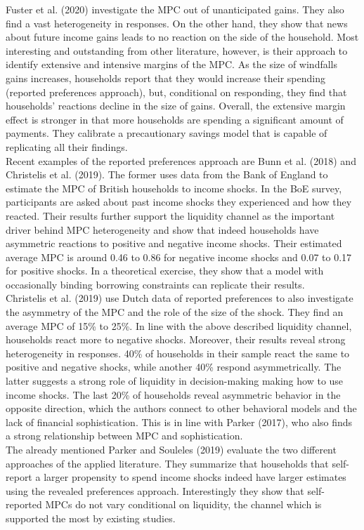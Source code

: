 Fuster et al. (2020) investigate the MPC out of unanticipated gains. They also find a vast heterogeneity in responses. On the other hand, they show that news about future income gains leads to no reaction on the side of the household. Most interesting and outstanding from other literature, however, is their approach to identify extensive and intensive margins of the MPC. As the size of windfalls gains increases, households report that they would increase their spending (reported preferences approach), but, conditional on responding, they find that households' reactions decline in the size of gains. Overall, the extensive margin effect is stronger in that more households are spending a significant amount of payments. They calibrate a precautionary savings model that is capable of replicating all their findings. \\
Recent examples of the reported preferences approach are Bunn et al. (2018) and Christelis et al. (2019). The former uses data from the Bank of England to estimate the MPC of British households to income shocks. In the BoE survey, participants are asked about past income shocks they experienced and how they reacted. Their results further support the liquidity channel as the important driver behind MPC heterogeneity and show that indeed households have asymmetric reactions to positive and negative income shocks. Their estimated average MPC is around 0.46 to 0.86 for negative income shocks and 0.07 to 0.17 for positive shocks. In a theoretical exercise, they show that a model with occasionally binding borrowing constraints can replicate their results.\\
Christelis et al. (2019) use Dutch data of reported preferences to also investigate the asymmetry of the MPC and the role of the size of the shock. They find an average MPC of 15\% to 25\%. In line with the above described liquidity channel, households react more to negative shocks. Moreover, their results reveal strong heterogeneity in responses. 40\% of households in their sample react the same to positive and negative shocks, while another 40\% respond asymmetrically. The latter suggests a strong role of liquidity in decision-making making how to use income shocks. The last 20\% of households reveal asymmetric behavior in the opposite direction, which the authors connect to other behavioral models and the lack of financial sophistication. This is in line with Parker (2017), who also finds a strong relationship between MPC and sophistication. \\
The already mentioned Parker and Souleles (2019) evaluate the two different approaches of the applied literature. They summarize that households that self-report a larger propensity to spend income shocks indeed have larger estimates using the revealed preferences approach. Interestingly they show that self-reported MPCs do not vary conditional on liquidity, the channel which is supported the most by existing studies. \\
